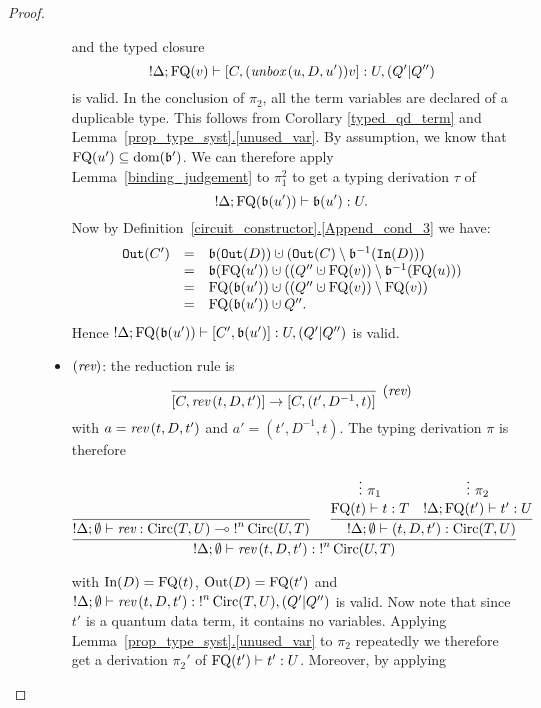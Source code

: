 \documentclass[twoside]{article}
\begin{document}
\begin{proof}
\begin{description}
\begin{itemize}
  and the typed closure
  \[
  {!}\Delta; \mathop{\textrm{FQ}}\nolimits(v) \vdash [C,(\mathop{\textit{unbox}}\nolimits\,(u,D,u'))v] :U,(Q'|Q'')
  \] 
  is valid. In the conclusion of $\pi_2$, all the 
  term variables are declared of a duplicable type. This 
  follows from Corollary \ref{typed_qd_term} and 
  Lemma~\hyperref[unused_var]{\ref*{prop_type_syst}.\ref*{unused_var}}. 
  By assumption, we know that $\mathop{\textrm{FQ}}\nolimits(u')\subseteq\mathop{\textrm{\rm dom}}\nolimits(\mathfrak{b}')$. 
  We can therefore apply Lemma~\hyperref[binding_judgement]
  {\ref*{binding_judgement}} to $\pi_1^2$ to get a typing 
  derivation $\tau$ of 
  \[
  {!}\Delta;\mathop{\textrm{FQ}}\nolimits(\mathfrak{b}(u'))\vdash \mathfrak{b}(u'):U.
  \]
  Now by 
  Definition~\hyperref[Append_cond_3]{\ref*{circuit_constructor}.\ref*{Append_cond_3}} 
  we have:
  \[
  \begin{array}{rcl}
  \mathtt{Out}(C') & = & \binding(\mathtt{Out}(D))\cupdot (\mathtt{Out}(C)\setminus\binding^{-1}(\mathtt{In}(D))) \\
                   & = & \binding(\FQ(u')) \cupdot ((Q''\cupdot\FQ(v))\setminus \binding^{-1}(\FQ(u))) \\
                   & = & \FQ(\binding(u')) \cupdot ((Q''\cupdot\FQ(v))\setminus \FQ(v)) \\
                   & = & \FQ(\binding(u'))\cupdot Q''.                   
  \end{array}
  \]
  Hence ${!}\Delta; \mathop{\textrm{FQ}}\nolimits(\mathfrak{b}(u'))\vdash [C',\mathfrak{b}(u')] :U,(Q'|Q'')$  is valid.
  \item $(\mathop{\textit{rev}}\nolimits)$: the reduction rule is
  \[
    \infer[(\rev)]{[C,\rev\,(t,D,t')]\to [C,(t',D^{-1},t)]}{}
  \]
  with $a=\mathop{\textit{rev}}\nolimits\,(t,D,t')$ and $a'=(t',D^{-1},t)$. The typing derivation $\pi$ 
  is therefore
  \begin{footnotesize}
  \[
  \infer[]{{!}\Delta;\emptyset\entails \rev\,(t,D,t'):{!}^n\Circ(U,T)}{
    \infer[]{{!}\Delta;\emptyset \entails \rev:\Circ(T,U)\loli {!}^n\Circ(U,T)}{
    }   
    &
    \infer[]{{!}\Delta ;\emptyset\entails (t,D,t'):\Circ(T,U)}{
      \deduce[]{\FQ(t)\entails t:T}{
        \vdots ~\pi_1
      }
      &
      \deduce[]{{!}\Delta;\FQ(t')\entails t':U}{
        \vdots ~\pi_2     
      }
    }
  }
  \]
  \end{footnotesize}  
  with $\mathop{\textrm{In}}\nolimits(D)=\mathop{\textrm{FQ}}\nolimits(t)$, $\mathop{\textrm{Out}}\nolimits(D)=\mathop{\textrm{FQ}}\nolimits(t')$ and 
  ${!}\Delta;\emptyset\vdash \mathop{\textit{rev}}\nolimits\,(t,D,t'):{!}^n\mathop{\textrm{Circ}}\nolimits(T,U),(Q'|Q'')$ is 
  valid. Now note that since $t'$ is a quantum data term, it contains no variables. 
  Applying Lemma~\hyperref[unused_var]{\ref*{prop_type_syst}.\ref*{unused_var}} 
  to $\pi_2$ repeatedly we therefore get a derivation $\pi_2'$ of 
  $\mathop{\textrm{FQ}}\nolimits(t')\vdash t':U$. Moreover, by applying

\end{itemize}
\end{description}
\end{proof}
\end{document}
